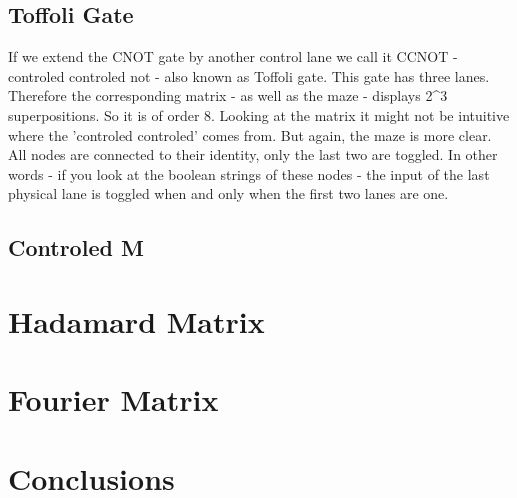 \documentclass[oneside]{thesisclass}
\begin{document}
\section{Toffoli Gate}
If we extend the CNOT gate by another control lane we call it CCNOT - controled controled not - also known as Toffoli gate.
This gate has three lanes.
Therefore the corresponding matrix - as well as the maze - displays 2^3 superpositions.
So it is of order 8.
Looking at the matrix%
it might not be intuitive where the 'controled controled' comes from.
But again, the maze%
is more clear. 
All nodes are connected to their identity, only the last two are toggled.
In other words - if you look at the boolean strings of these nodes - the input of the last physical lane is toggled when and only when the first two lanes are one.

\section{Controled M}

\chapter{Hadamard Matrix}

\chapter{Fourier Matrix}

\chapter{Conclusions}




\end{document}
